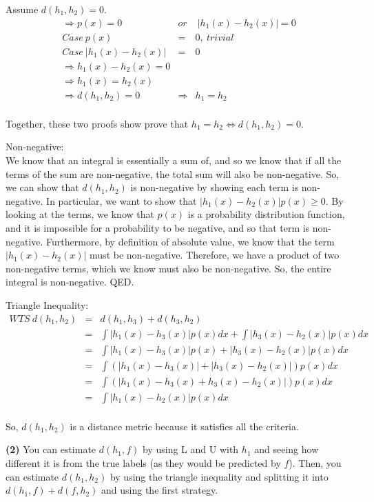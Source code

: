 \documentclass[11pt]{article}
\renewcommand{\part}[1] {\vspace{.10in} {\bf (#1)}}
\begin{document}
Assume $d(h_1, h_2) = 0$.
\begin{eqnarray*}
\Rightarrow p(x) = 0 \ &or& \ |h_1(x) - h_2(x)| = 0\\
Case \ p(x) &=& 0, \ trivial\\
Case \ |h_1(x) - h_2(x)| &=& 0\\
\Rightarrow h_1(x) - h_2(x) = 0\\
\Rightarrow h_1(x) = h_2(x)\\
\Rightarrow d(h_1, h_2) = 0 &\Rightarrow&  h_1 = h_2\\
\end{eqnarray*}

Together, these two proofs show prove that $h_1 = h_2 \iff d(h_1, h_2) = 0$. 



Non-negative:\\
We know that an integral is essentially a sum of, and so we know that if all the terms of the sum are non-negative, the total sum will also be non-negative. So, we can show that $d(h_1, h_2)$ is non-negative by showing each term is non-negative. In particular, we want to show that $|h_1(x) - h_2(x)|p(x) \geq 0$. By looking at the terms, we know that $p(x)$ is a probability distribution function, and it is impossible for a probability to be negative, and so that term is non-negative. Furthermore, by definition of absolute value, we know that the term $|h_1(x) - h_2(x)|$ must be non-negative. Therefore, we have a product of two non-negative terms, which we know must also be non-negative. So, the entire integral is non-negative. QED.

Triangle Inequality:\\
\begin{eqnarray*}
WTS \ d(h_1, h_2) &=& d(h_1, h_3) + d(h_3, h_2)\\
&=& \int |h_1(x) - h_3(x)|p(x)dx +  \int |h_3(x) - h_2(x)|p(x)dx\\
&=& \int |h_1(x) - h_3(x)|p(x) + |h_3(x) - h_2(x)|p(x)dx\\
&=& \int (|h_1(x) - h_3(x)| + |h_3(x) - h_2(x)|)p(x)dx\\
&=& \int (|h_1(x) - h_3(x) + h_3(x) - h_2(x)|)p(x)dx\\
&=& \int |h_1(x) - h_2(x)|p(x)dx\\
\end{eqnarray*}

So, $d(h_1, h_2)$ is a distance metric because it satisfies all the criteria.

\part{2}
You can estimate $d(h_1, f)$ by using L and U with $h_1$ and seeing how different it is from the true labels (as they would be predicted by $f$). Then, you can estimate $d(h_1, h_2)$ by using the triangle inequality and splitting it into $d(h_1, f) + d(f, h_2)$ and using the first strategy.
\end{document}
